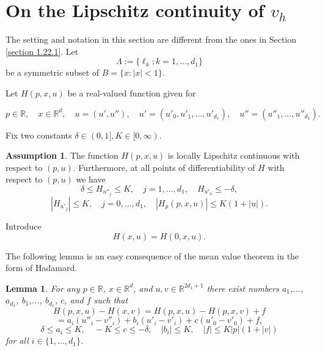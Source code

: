 \documentclass[11pt, reqno]{amsart}
\newtheorem{lemma}[theorem]{Lemma}
\theoremstyle{definition}
\newtheorem{assumption}{Assumption}[section]
\theoremstyle{remark}
\begin{document}
{\section{{On the Lipschitz continuity
of $v_{h}$}}
      \setcounter{equation}{0}}

                                            \label{section 7.25.1}

The setting and notation in this section
are different from the ones in Section \ref{section 1.22.1}. 
Let
$$
\Lambda:=\{ \ell_{k};k=  1,...,  d_{1}\} 
$$
be a symmetric subset of   $B=\{x:|x|<1\}$.   

 Let $H(p,x,u)$ be a real-valued function
given for

$$
 p\in{\mathbb{R}},\quad x\in
{\mathbb{R}}^{d},\quad u=(u',u''),\quad u'=(u'_{0},u'_{1},
...,u'_{d_{1}}),
\quad u''=
(u''_{1},...,u''_{d_{1}}).
$$

Fix two constants $\delta\in(0,1],K\in[0,\infty)$.

\begin{assumption}
                                         \label{assumption 6.11.1}
The function $H(p,x,u)$ is locally Lipschitz continuous with respect 
to $(p,u)$. Furthermore, at all points of differentiability 
of $H$ with respect to $(p,u)$
we have
$$
\delta \leq H_{u''_{j}} \leq K ,
\quad j=1,...,d_{1},\quad H_{u'_{0}}\leq-\delta,
$$
$$
|H_{u'_{j}}|\leq K,\quad j=0,...,d_{1},\quad
|H_{p}(p,x,u)|\leq K(1+|u|) .
$$

\end{assumption}

Introduce
$$
H(x,u)=H(0,x,u).
$$

The following lemma is an easy consequence of the mean value
theorem in the form of Hadamard.
\begin{lemma}
                                       \label{lemma 6.17.1}
For any $p\in{\mathbb{R}} $, $x\in{\mathbb{R}}^{d}$, and $u,v\in{\mathbb{R}}^{2d_{1}+1}$
there exist  numbers $a_{1}$,..., $a_{d_{1}}$,
$b_{1}$,..., $b_{d_{1}}$,
 $c$, and $f$ such that
$$
H(p,x,u)-H(x,v)=H(p,x,u)-H(p,x,v)+f
$$
$$
=a_{i}(u''_{i}-v''_{i})+b_{i}
(u' _{i}-v' _{i})+c(u'_{0}-v'_{0})+f,
$$
\begin{equation}
                                                  \label{6.17.1}
\delta\leq a_{i}\leq K,\quad -K\leq c\leq-\delta,\quad
|b_{i}|\leq K,\quad |f|\leq K|p|(1+ |v|)
\end{equation}
for all $i\in\{1,...,d_{1}\} $.
\end{lemma}

 
\end{document}
